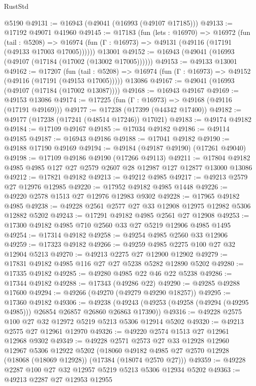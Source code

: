 \begin{lexlean}{RustStd}
\begin{coremodule}
    @5190
@49131 := @16943 (@49041 (@16993 (@49107 @17185)))
@49133 := @17192 @49071 @41960
@49145 := @17183
    (fun (lets : @16970) =>
    @16972
      (fun (tail : @5208) =>
      @16974 (fun (Γ : @16973) => @49131 (@49116 (@17191 (@49133 @17003 @17005))))))
    @13001
@49152 := @16943 (@49041 (@16993 (@49107 (@17184 (@17002 (@13002 @17005))))))
@49153 := @49133 @13001
@49162 := @17207
    (fun (tail : @5208) => @16974 (fun (Γ : @16973) => @49152 (@49116 (@17191 (@49153 @17005)))))
    @13086
@49167 := @49041 (@16993 (@49107 (@17184 (@17002 @13087))))
@49168 := @16943 @49167
@49169 := @49153 @13086
@49174 := @17225 (fun (Γ : @16973) => @49168 (@49116 (@17191 @49169)))
@49177 := @17238 (@17399 (@44342 @17400))
@49182 := @49177 (@17238 (@17241 (@48514 @17246)) @17021)
@49183 := @49174 @49182
@49184 := @17109 @49167
@49185 := @17034 @49182
@49186 := @49114 @49185
@49187 := @16943 @49186
@49188 := @17041 @49182
@49190 := @49188 @17190 @49169
@49194 := @49184 (@49187 @49190) (@17261 @49040)
@49198 := @17109 @49186 @49190 (@17266 @49113)
@49211 := @17804 @49182 @4985 @4985 @127 @27 @2579 @2607 @28 @12987 @127 @12877 @13000 @13086
@49212 := @17821 @49182
@49213 := @49212 @4985
@49217 := @49213 @2579 @27 @12976 @12985
@49220 := @17952 @49182 @4985 @1448
@49226 := @49220 @2578 @1513 @27 @12976 @12983 @9302
@49228 := @17965 @49182 @4985
@49238 := @49228 @2561 @2577 @27 @33 @12908 @12975 @12982 @5306 @12882 @5202
@49243 := @17291 @49182 @4985 @2561 @27 @12908
@49253 := @17300 @49182 @4985 @710 @2560 @33 @27 @5219 @12906 @4985 @1495
@49254 := @17314 @49182
@49258 := @49254 @4985 @2560 @33 @12906
@49259 := @17323 @49182
@49266 := @49259 @4985 @2275 @100 @27 @32 @12904 @5213
@49270 := @49213 @2275 @27 @12900 @12902
@49279 := @17831 @49182 @4985 @116 @27 @27 @5238 @5282 @12890 @5202
@49280 := @17335 @49182
@49285 := @49280 @4985 @22 @46 @22 @5238
@49286 := @17344 @49182
@49288 := @17343 (@49286 @22)
@49290 := @49285 @49288 @17600
@49294 := @49266 (@49270 (@49279 @49290 @18257))
@49295 := @17360 @49182
@49306 := @49238
    (@49243 (@49253 (@49258 (@49294 (@49295 @4985))) @26854 @26857 @26860 @26863 @17390))
@49316 := @49228 @2575 @100 @27 @32 @12972 @5219 @5213 @5306 @12914 @5202
@49320 := @49213 @2575 @27 @12961 @12970
@49326 := @49220 @2574 @1513 @27 @12961 @12968 @9302
@49349 := @49228
    @2571
    @2573
    @27
    @33
    @12928
    @12960
    @12967
    @5306
    @12922
    @5202
    (@18060 @49182 @4985 @27 @2570 @12928 (@18068 (@18069 @12928)) (@17384 (@18074 @2570 @27)))
@49359 := @49228 @2287 @100 @27 @32 @12957 @5219 @5213 @5306 @12934 @5202
@49363 := @49213 @2287 @27 @12953 @12955

\end{coremodule}
\end{lexlean}

